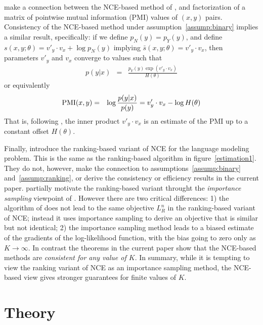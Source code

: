 \documentclass[11pt,a4paper]{article}
\newcommand{\str}[3]{s(#1, #2; #3)}
\newcommand{\ssf}[3]{\bar{s}(#1, #2; #3)}
\begin{document}
\citet{Levy:2014:NWE} make a connection between the NCE-based method
of \cite{Mikolov:2013}, and factorization of a matrix of
pointwise mutual information (PMI) values of $(x, y)$ pairs. 
Consistency of the NCE-based
method under assumption~\ref{assump:binary} implies a similar result,
specifically: if we define $p_N(y) = p_Y(y)$, and define
$\str{x}{y}{\theta} = v'_y \cdot v_x + \log p_N(y)$
implying $\ssf{x}{y}{\theta} = v'_y \cdot v_x$,
then parameters
$v'_y$ and $v_x$ converge to values such that
\begin{eqnarray*}
p(y | x) &=& 
\frac{p_Y(y) \exp \left ( v'_y \cdot v_x \right )}{H(\theta)}
\end{eqnarray*}
or equivalently
\begin{eqnarray*}
\hbox{PMI}(x, y) &=& \log \frac{p(y | x)}{p(y)} = 
v'_y \cdot v_x - \log H(\theta)
\end{eqnarray*}
That is, following \cite{Levy:2014:NWE}, the
inner product $v'_y \cdot v_x$ is an estimate of the PMI
up to a constant offset $H(\theta)$.

Finally, \citet{jozefowicz2016exploring} introduce the ranking-based
variant of NCE for the language modeling problem. This is 
the same as the ranking-based algorithm in figure~\ref{estimation1}.
They do not, however, make the connection to
assumptions~\ref{assump:binary} and~\ref{assump:ranking}, or derive
the consistency or efficiency results in the current paper.
\citet{jozefowicz2016exploring} partially motivate the ranking-based
variant throught the {\em importance sampling} viewpoint of
\citet{bengio2008adaptive}. However there are two critical 
differences: 1) the algorithm of \citet{bengio2008adaptive} does
not lead to the same objective $L^n_R$ in the ranking-based
variant of NCE; instead it uses importance sampling to
derive an objective that is similar but not identical; 2) 
the importance sampling method leads to a biased estimate
of the gradients of the log-likelihood function, with the bias
going to zero only as $K \rightarrow \infty$. In contrast the
theorems in the current paper show that the NCE-based methods
are {\em consistent for any value of $K$}. In summary, while
it is tempting to view the ranking variant of NCE as an importance
sampling method, the NCE-based view gives stronger guarantees for
finite values of $K$.




\section{Theory}
\label{sec:theory}
\end{document}
